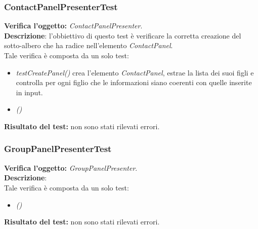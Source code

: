\subsubsection{ContactPanelPresenterTest}
\textbf{Verifica l'oggetto:} \textit{ContactPanelPresenter}.\\
\textbf{Descrizione}: l'obbiettivo di questo test è verificare la corretta creazione del sotto-albero che ha radice nell'elemento \textit{ContactPanel}.\\
Tale verifica è composta da un solo test:
\begin{itemize}
\item \textit{testCreatePanel() }crea l'elemento \textit{ContactPanel}, estrae la lista dei suoi figli e controlla per ogni figlio che le informazioni siano coerenti con quelle inserite in input.
\item \textit{()} %
\end{itemize}
\textbf{Risultato del test:} non sono stati rilevati errori.

\subsubsection{GroupPanelPresenterTest}
\textbf{Verifica l'oggetto:} \textit{GroupPanelPresenter}.\\
\textbf{Descrizione}:\\
Tale verifica è composta da un solo test:
\begin{itemize}
\item \textit{() } %
\end{itemize}
\textbf{Risultato del test:} non sono stati rilevati errori.

